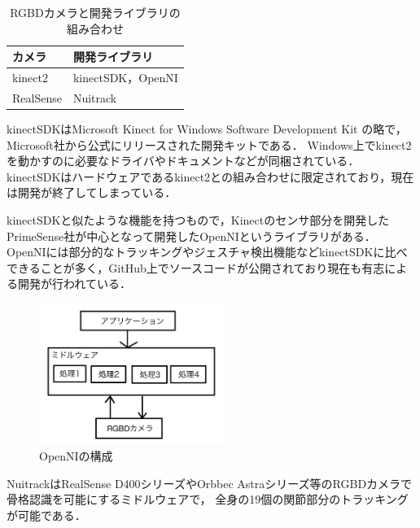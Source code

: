 \documentclass[titlepage]{jarticle}
\begin{document}
\begin{table}[t!]
  \centering
  \caption{RGBDカメラと開発ライブラリの組み合わせ}
  \begin{tabular}{l|l}\hline
    カメラ       & 開発ライブラリ          \\\hline
    kinect2   & kinectSDK，OpenNI \\
    RealSense & Nuitrack         \\\hline
  \end{tabular}
  \label{RGBD}
\end{table}

kinectSDKはMicrosoft Kinect for Windows Software Development Kit の略で，Microsoft社から公式にリリースされた開発キットである．
Windows上でkinect2を動かすのに必要なドライバやドキュメントなどが同梱されている．
kinectSDKはハードウェアであるkinect2との組み合わせに限定されており，現在は開発が終了してしまっている．

kinectSDKと似たような機能を持つもので，Kinectのセンサ部分を開発したPrimeSense社が中心となって開発したOpenNIというライブラリがある．
OpenNIには部分的なトラッキングやジェスチャ検出機能などkinectSDKに比べできることが多く，GitHub上でソースコードが公開されており現在も有志による開発が行われている．

\begin{figure}[b!]
  \centering
  \includegraphics[width=6cm]{img/app3.jpg}
  \caption{OpenNIの構成}
  \label{app}
\end{figure}



NuitrackはRealSense D400シリーズやOrbbec Astraシリーズ等のRGBDカメラで骨格認識を可能にするミドルウェアで，
全身の19個の関節部分のトラッキングが可能である．
%
%
%
\end{document}
